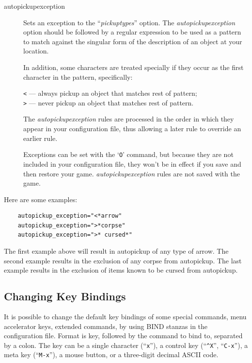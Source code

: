\documentclass[titlepage]{article}
\begin{document}
\begin{description}
\item[autopickup\textunderscore exception]
Sets an exception to the ``\textit{pickup\textunderscore types}'' option.
The \textit{autopickup\textunderscore exception} option should be followed by a regular
expression to be used as a pattern to match against the singular form of the
description of an object at your location.

In addition, some characters are treated specially if they occur as the first
character in the pattern, specifically:

\texttt{<} --- always pickup an object that matches rest of pattern;\\
\texttt{>} --- never pickup an object that matches rest of pattern.

The \textit{autopickup\textunderscore exception} rules are processed in the order
in which they appear in your configuration file, thus allowing a
later rule to override an earlier rule.

Exceptions can be set with the `\texttt{O}' command, but because they are not
included in your configuration file, they won't be in effect if you save
and then restore your game.
\textit{autopickup\textunderscore exception} rules are not saved with the game.
\end{description}

Here are some examples:
\begin{verbatim}
    autopickup_exception="<*arrow"
    autopickup_exception=">*corpse"
    autopickup_exception=">* cursed*"
\end{verbatim}

The first example above will result in autopickup of any type of arrow.
The second example results in the exclusion of any corpse from autopickup.
The last example results in the exclusion of items known to be cursed from
autopickup.


\subsection*{Changing Key Bindings}

It is possible to change the default key bindings of some special commands,
menu accelerator keys, extended commands, by using BIND stanzas in the
configuration file. Format is key, followed by the command to bind to,
separated by a colon. The key can be a single character (``\texttt{x}''),
a control key (``\texttt{\textasciicircum X}'', ``\texttt{C-x}''), a meta key (``\texttt{M-x}''),
a mouse button, or a three-digit decimal ASCII code.
\end{document}
